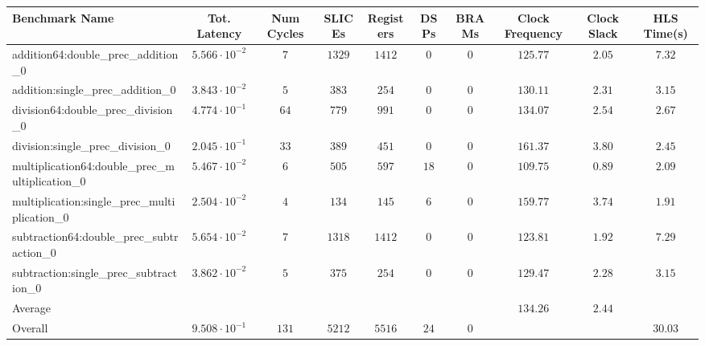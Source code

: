 \begin{tabular}{|l|c|c|c|c|c|c|c|c|c|}
\hline
Benchmark Name                                   & Tot. Latency            & Num Cycles & SLICEs   & Registers & DSPs   & BRAMs & Clock Frequency & Clock Slack & HLS Time(s) \\
\hline
addition64:double\_prec\_addition\_0             & $ 5.566 \cdot 10^{-2} $ & $ 7      $ & $ 1329 $ & $ 1412  $ & $ 0  $ & $ 0 $ & $ 125.77      $ & $ 2.05    $ & $ 7.32    $ \\
addition:single\_prec\_addition\_0               & $ 3.843 \cdot 10^{-2} $ & $ 5      $ & $ 383  $ & $ 254   $ & $ 0  $ & $ 0 $ & $ 130.11      $ & $ 2.31    $ & $ 3.15    $ \\
division64:double\_prec\_division\_0             & $ 4.774 \cdot 10^{-1} $ & $ 64     $ & $ 779  $ & $ 991   $ & $ 0  $ & $ 0 $ & $ 134.07      $ & $ 2.54    $ & $ 2.67    $ \\
division:single\_prec\_division\_0               & $ 2.045 \cdot 10^{-1} $ & $ 33     $ & $ 389  $ & $ 451   $ & $ 0  $ & $ 0 $ & $ 161.37      $ & $ 3.80    $ & $ 2.45    $ \\
multiplication64:double\_prec\_multiplication\_0 & $ 5.467 \cdot 10^{-2} $ & $ 6      $ & $ 505  $ & $ 597   $ & $ 18 $ & $ 0 $ & $ 109.75      $ & $ 0.89    $ & $ 2.09    $ \\
multiplication:single\_prec\_multiplication\_0   & $ 2.504 \cdot 10^{-2} $ & $ 4      $ & $ 134  $ & $ 145   $ & $ 6  $ & $ 0 $ & $ 159.77      $ & $ 3.74    $ & $ 1.91    $ \\
subtraction64:double\_prec\_subtraction\_0       & $ 5.654 \cdot 10^{-2} $ & $ 7      $ & $ 1318 $ & $ 1412  $ & $ 0  $ & $ 0 $ & $ 123.81      $ & $ 1.92    $ & $ 7.29    $ \\
subtraction:single\_prec\_subtraction\_0         & $ 3.862 \cdot 10^{-2} $ & $ 5      $ & $ 375  $ & $ 254   $ & $ 0  $ & $ 0 $ & $ 129.47      $ & $ 2.28    $ & $ 3.15    $ \\
\hline
Average                                          & $                     $ & $        $ & $      $ & $       $ & $    $ & $   $ & $ 134.26      $ & $ 2.44    $ & $         $ \\
\hline
Overall                                          & $ 9.508 \cdot 10^{-1} $ & $ 131    $ & $ 5212 $ & $ 5516  $ & $ 24 $ & $ 0 $ & $             $ & $         $ & $ 30.03   $ \\
\hline
\end{tabular}
